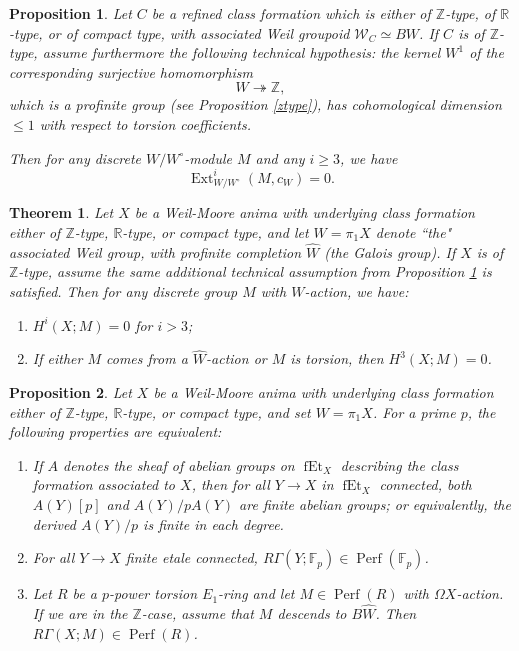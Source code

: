 \documentclass[10pt,a4paper]{amsart}
\newtheorem{proposition}{Proposition}
\newtheorem{theorem}{Theorem}
\newcommand{\mbb}{\mathbb}
\newcommand{\mc}{\mathcal}
\newcommand{\on}{\operatorname}
\newcommand{\wh}{\widehat}
\begin{document}
\begin{proposition}\label{extvanishing}
Let $C$ be a refined class formation which is either of $\mbb{Z}$-type, of $\mbb{R}$-type, or of compact type, with associated Weil groupoid $\mc{W}_C\simeq BW$.  If $C$ is of $\mbb{Z}$-type, assume furthermore the following technical hypothesis: the kernel $W^1$ of the corresponding surjective homomorphism
$$W \twoheadrightarrow \mbb{Z},$$
which is a profinite group (see Proposition \ref{ztype}), has cohomological dimension $\leq 1$ with respect to torsion coefficients.


Then for any discrete $W/W^\circ$-module $M$ and any $i\geq 3$, we have
$$\on{Ext}^i_{W/W^\circ}(M,c_W)=0.$$
\end{proposition}

\begin{theorem}\label{strictcohdim}
Let $X$ be a Weil-Moore anima with underlying class formation either of $\mbb{Z}$-type, $\mbb{R}$-type, or compact type, and let $W=\pi_1X$ denote ``the" associated Weil group, with profinite completion $\wh{W}$ (the Galois group).  If $X$ is of $\mbb{Z}$-type, assume the same additional technical assumption from Proposition \ref{extvanishing} is satisfied. Then for any discrete group $M$ with $W$-action, we have:
\begin{enumerate}
\item $H^i(X;M)=0$ for $i>3$;
\item If either $M$ comes from a $\wh{W}$-action or $M$ is torsion, then $H^3(X;M)=0$.
\end{enumerate}
\end{theorem}

\begin{proposition}\label{pfinite}
Let $X$ be a Weil-Moore anima with underlying class formation either of $\mbb{Z}$-type, $\mbb{R}$-type, or compact type, and set $W=\pi_1X$.  For a prime $p$, the following properties are equivalent:
\begin{enumerate}
\item If $A$ denotes the sheaf of abelian groups on $\on{fEt}_X$ describing the class formation associated to $X$, then for all $Y\to X$ in $\on{fEt}_X$ connected, both $A(Y)[p]$ and $A(Y)/pA(Y)$ are finite abelian groups; or equivalently, the derived $A(Y)/p$ is finite in each degree.
\item For all $Y\to X$ finite etale connected, $R\Gamma(Y;\mbb{F}_p)\in\on{Perf}(\mbb{F}_p)$.
\item Let $R$ be a $p$-power torsion $E_1$-ring and let $M\in \on{Perf}(R)$ with $\Omega X$-action.  If we are in the $\mbb{Z}$-case, assume that $M$ descends to $B\wh{W}$.  Then $R\Gamma(X;M)\in \on{Perf}(R)$.
\end{enumerate}
\end{proposition}
\end{document}
